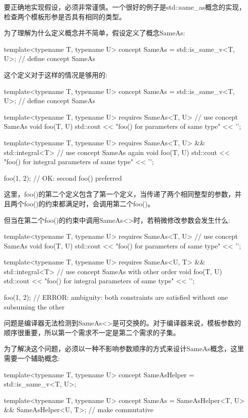 要正确地实现假设，必须非常谨慎。一个很好的例子是std::same\_as概念的实现，检查两个模板形参是否具有相同的类型。

为了理解为什么定义概念并不简单，假设定义了概念SameAs:

\begin{cpp}
template<typename T, typename U>
concept SameAs = std::is_same_v<T, U>; // define concept SameAs
\end{cpp}

这个定义对于这样的情况是够用的:

\begin{cpp}
template<typename T, typename U>
concept SameAs = std::is_same_v<T, U>; // define concept SameAs

template<typename T, typename U>
requires SameAs<T, U> // use concept SameAs
void foo(T, U)
{
	std::cout << "foo() for parameters of same type" << '\n';
}

template<typename T, typename U>
requires SameAs<T, U> && std::integral<T> // use concept SameAs again
void foo(T, U)
{
	std::cout << "foo() for integral parameters of same type" << '\n';
}

foo(1, 2); // OK: second foo() preferred
\end{cpp}

这里，foo()的第二个定义包含了第一个定义，当传递了两个相同整型的参数，并且两个foo()的约束都满足时，会调用第二个foo()。

但当在第二个foo()的约束中调用SameAs<>时，若稍微修改参数会发生什么:

\begin{cpp}
template<typename T, typename U>
requires SameAs<T, U> // use concept SameAs
void foo(T, U)
{
	std::cout << "foo() for parameters of same type" << '\n';
}

template<typename T, typename U>
requires SameAs<U, T> && std::integral<T> // use concept SameAs with other order
void foo(T, U)
{
	std::cout << "foo() for integral parameters of same type" << '\n';
}

foo(1, 2); // ERROR: ambiguity: both constraints are satisfied without one subsuming the other
\end{cpp}

问题是编译器无法检测到SameAs<>是可交换的。对于编译器来说，模板参数的顺序很重要，所以第一个需求不一定是第二个需求的子集。

为了解决这个问题，必须以一种不影响参数顺序的方式来设计SameAs概念，这里需要一个辅助概念:

\begin{cpp}
template<typename T, typename U>
concept SameAsHelper = std::is_same_v<T, U>;

template<typename T, typename U>
concept SameAs = SameAsHelper<T, U> && SameAsHelper<U, T>; // make commutative
\end{cpp}

